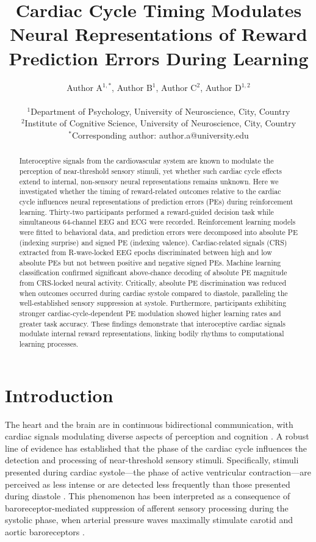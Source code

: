 \documentclass[12pt]{article}
\title{Cardiac Cycle Timing Modulates Neural Representations of Reward Prediction Errors During Learning}
\author{Author A$^{1,*}$, Author B$^{1}$, Author C$^{2}$, Author D$^{1,2}$ \\
\\
\small $^{1}$Department of Psychology, University of Neuroscience, City, Country \\
\small $^{2}$Institute of Cognitive Science, University of Neuroscience, City, Country \\
\small $^{*}$Corresponding author: author.a@university.edu}
\date{}
\begin{document}
\maketitle

\begin{abstract}
Interoceptive signals from the cardiovascular system are known to modulate the perception of near-threshold sensory stimuli, yet whether such cardiac cycle effects extend to internal, non-sensory neural representations remains unknown. Here we investigated whether the timing of reward-related outcomes relative to the cardiac cycle influences neural representations of prediction errors (PEs) during reinforcement learning. Thirty-two participants performed a reward-guided decision task while simultaneous 64-channel EEG and ECG were recorded. Reinforcement learning models were fitted to behavioral data, and prediction errors were decomposed into absolute PE (indexing surprise) and signed PE (indexing valence). Cardiac-related signals (CRS) extracted from R-wave-locked EEG epochs discriminated between high and low absolute PEs but not between positive and negative signed PEs. Machine learning classification confirmed significant above-chance decoding of absolute PE magnitude from CRS-locked neural activity. Critically, absolute PE discrimination was reduced when outcomes occurred during cardiac systole compared to diastole, paralleling the well-established sensory suppression at systole. Furthermore, participants exhibiting stronger cardiac-cycle-dependent PE modulation showed higher learning rates and greater task accuracy. These findings demonstrate that interoceptive cardiac signals modulate internal reward representations, linking bodily rhythms to computational learning processes.
\end{abstract}

\section{Introduction}

The heart and the brain are in continuous bidirectional communication, with cardiac signals modulating diverse aspects of perception and cognition \citep{garfinkel2015knowing, critchley2015neural}. A robust line of evidence has established that the phase of the cardiac cycle influences the detection and processing of near-threshold sensory stimuli. Specifically, stimuli presented during cardiac systole---the phase of active ventricular contraction---are perceived as less intense or are detected less frequently than those presented during diastole \citep{edwards2009sensory, salomon2016brain}. This phenomenon has been interpreted as a consequence of baroreceptor-mediated suppression of afferent sensory processing during the systolic phase, when arterial pressure waves maximally stimulate carotid and aortic baroreceptors \citep{rau2009baroreceptor, park2014peripheral}.
\end{document}
